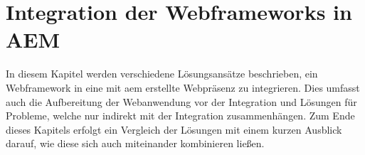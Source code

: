 \chapter{Integration der Webframeworks in AEM}
\label{sec:integration-der-webframeworks-in-aem}
In diesem Kapitel werden verschiedene Lösungsansätze beschrieben, ein Webframework in eine mit \ac{aem} erstellte Webpräsenz zu integrieren. Dies umfasst auch die Aufbereitung der Webanwendung vor der Integration und Lösungen für Probleme, welche nur indirekt mit der Integration zusammenhängen. Zum Ende dieses Kapitels erfolgt ein Vergleich der Lösungen mit einem kurzen Ausblick darauf, wie diese sich auch miteinander kombinieren ließen.


















